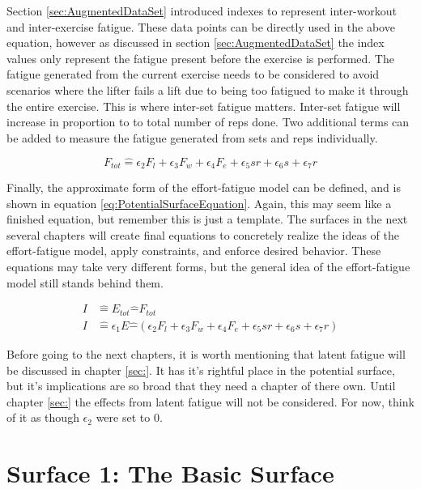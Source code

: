 Section \ref{sec:AugmentedDataSet} introduced indexes to represent inter-workout and inter-exercise fatigue. These data points can be directly used in the above equation, however as discussed in section \ref{sec:AugmentedDataSet} the index values only represent the fatigue present before the exercise is performed. The fatigue generated from the current exercise needs to be considered to avoid scenarios where the lifter fails a lift due to being too fatigued to make it through the entire exercise. This is where inter-set fatigue matters. Inter-set fatigue will increase in proportion to to total number of reps done. Two additional terms can be added to measure the fatigue generated from sets and reps individually.

\begin{equation*}
	F_{tot} \hat{=} \epsilon_2 F_l+\epsilon_3 F_w+\epsilon_4 F_e+\epsilon_5 sr+\epsilon_6 s+\epsilon_7 r
\end{equation*}

Finally, the approximate form of the effort-fatigue model can be defined, and is shown in equation \ref{eq:PotentialSurfaceEquation}. Again, this may seem like a finished equation, but remember this is just a template. The surfaces in the next several chapters will create final equations to concretely realize the ideas of the effort-fatigue model, apply constraints, and enforce desired behavior. These equations may take very different forms, but the general idea of the effort-fatigue model still stands behind them.

\begin{equation}
	\label{eq:PotentialSurfaceEquation}
	\begin{split}
		I & \hat{=} E_{tot}\hat{-}F_{tot} \\
		I & \hat{=} \epsilon_1 E\hat{-}\left( 
			\epsilon_2 F_l+\epsilon_3 F_w+\epsilon_4 F_e+\epsilon_5 sr+\epsilon_6 s+\epsilon_7 r
		\right)
	\end{split}
\end{equation}

Before going to the next chapters, it is worth mentioning that latent fatigue will be discussed in chapter \ref{sec:}. It has it's rightful place in the potential surface, but it's implications are so broad that they need a chapter of there own. Until chapter \ref{sec:} the effects from latent fatigue will not be considered. For now, think of it as though $\epsilon_2$ were set to $0$. 


\chapter{Surface 1: The Basic Surface}
\label{sec:PotentialSurfaceTheBasicSurface}

